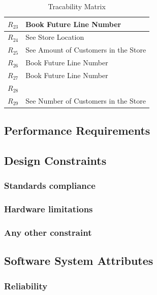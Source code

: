 \begin{table}[H]
\begin{tabular}{|p{8cm}|p{8cm}|}
        $R_{23}$ & Book Future Line Number\\ \hline
        $R_{24}$ & See Store Location\\ \hline
        $R_{25}$ & See Amount of Customers in the Store\\ \hline
        $R_{26}$ & Book Future Line Number\\ \hline
        $R_{27}$ & Book Future Line Number\\ \hline
        $R_{28}$ & \\ \hline
        $R_{29}$ & See Number of Customers in the Store\\ \hline
    \end{tabular}
    \caption{Tracability Matrix}
\end{table}
\subsection{Performance Requirements}


\subsection{Design Constraints}

\subsubsection{Standards compliance}

\subsubsection{Hardware limitations}
\subsubsection{Any other constraint}


\subsection{Software System Attributes}

\subsubsection{Reliability}

